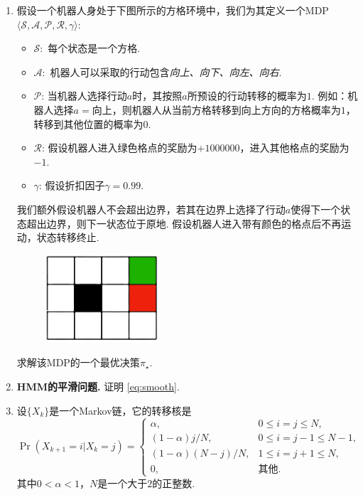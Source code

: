 \begin{enumerate}[wide, labelindent=0pt]
    \item 假设一个机器人身处于下图所示的方格环境中，我们为其定义一个MDP $\langle\mathcal S,\mathcal A,\mathcal P,\mathcal R,\gamma\rangle$:
    \begin{itemize}
        \item $\mathcal S:$ 每个状态是一个方格.
        \item $\mathcal A:$ 机器人可以采取的行动包含\textit{向上、向下、向左、向右}.
        \item $\mathcal P$: 当机器人选择行动$a$时，其按照$a$所预设的行动转移的概率为$1$. 例如：机器人选择$a=\text{向上}$，则机器人从当前方格转移到向上方向的方格概率为$1$，转移到其他位置的概率为$0$.
        \item $\mathcal R$: 假设机器人进入绿色格点的奖励为$+1000000$，进入其他格点的奖励为$-1$.
        \item $\gamma$: 假设折扣因子$\gamma=0.99$.
    \end{itemize}
    我们额外假设机器人不会超出边界，若其在边界上选择了行动$a$使得下一个状态超出边界，则下一状态位于原地. 假设机器人进入带有颜色的格点后不再运动，状态转移终止.
    \begin{figure}[h]
        \centering
        \includegraphics[width=0.4\textwidth]{figures/Markov-chain/exercise-mdp.pdf}
    \end{figure}
    
    求解该MDP的一个最优决策$\pi_\star$.

    \item \textbf{HMM的平滑问题. }\label{exercise:smooth-HMM}证明 \eqref{eq:smooth}.
    
    \item \label{exercise:ball-A-num} 设$\{X_k\}$是一个Markov链，它的转移核是
    \[
        \Pr(X_{k+1}=i|X_k=j) = \begin{cases}
            \alpha, & 0\leq i = j\leq N,\\
            (1-\alpha)j/N, & 0\leq i = j-1\leq N-1,\\
            (1-\alpha)(N-j)/N, & 1\leq i = j+1\leq N,\\
            0, & \text{其他}.
        \end{cases}
    \]
    其中$0<\alpha<1$，$N$是一个大于$2$的正整数.


\end{enumerate}
